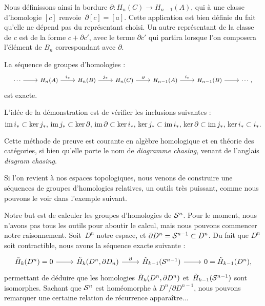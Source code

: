 Nous définissons ainsi la bordure $\partial:H_n(C)\to H_{n-1}(A)$, qui à une classe d'homologie $[c]$ renvoie~$\partial[c]=[a]$. Cette application est bien définie du fait qu'elle ne dépend pas du représentant choisi. Un autre représentant de la classe de $c$ est de la forme $c+\partial c'$, avec le terme $\partial c'$ qui partira lorsque l'on composera l'élément de $B_n$ correspondant avec $\partial$.

\begin{theorem}
La séquence de groupes d'homologies : \[\footnotesize\begin{tikzcd}
\cdots\arrow[r]&H_n(A)\arrow[r,"i_\ast"]&H_n(B)\arrow[r,"j_\ast"]&H_n(C)\arrow[r,"\partial"]&H_{n-1}(A)\arrow[r,"i_\ast"]&H_{n-1}(B)\arrow[r]&\cdots,
\end{tikzcd}\]est exacte.
\end{theorem}
L'idée de la démonstration est de vérifier les inclusions suivantes \cite{Hatcher} : \[\mathrm{im}\, i_\ast\subset \ker j_\ast,\,\mathrm{im}\, j_\ast\subset\ker\partial,\,\mathrm{im}\,\partial\subset\ker i_\ast,\,\ker j_\ast\subset\mathrm{im}\, i_\ast,\,\ker\partial\subset\mathrm{im}\, j_\ast,\,\ker i_\ast\subset i_\ast.\]
\begin{remark}
Cette méthode de preuve est courante en algèbre homologique et en théorie des catégories, si bien qu'elle porte le nom de \emph{diagramme chasing}, venant de l'anglais \emph{diagram chasing}.
\end{remark}

Si l'on revient à nos espaces topologiques, nous venons de construire une séquences de groupes d'homologies relatives, un outils très puissant, comme nous pouvons le voir dans l'exemple suivant.

\begin{exemple}
Notre but est de calculer les groupes d'homologies de $\mathcal{S}^{n}$. Pour le moment, nous n'avons pas tous les outils pour aboutir le calcul, mais nous pouvons commencer notre raisonnement. Soit~$D^n$ notre espace, et $\partial D^n=\mathcal{S}^{n-1}\subset D^n$. Du fait que $D^n$ soit contractible, nous avons la séquence exacte suivante :\[\begin{tikzcd}
\Tilde{H}_k(D^n)=0\arrow[r]&\Tilde{H}_k(D^n,\partial D_n)\arrow[r,"\partial"]&\Tilde{H}_{k-1}(\s{n-1})\arrow[r]&0=\Tilde{H}_{k-1}(D^n),
\end{tikzcd}\]permettant de déduire que les homologies $\Tilde{H}_k(D^n,\partial D^n)$ et~$\Tilde{H}_{k-1}(\mathcal{S}^{n-1})$ sont isomorphes. Sachant que $\mathcal{S}^{n}$ est homéomorphe à $D^n/\partial D^{n-1}$, nous pouvons remarquer une certaine relation de récurrence apparaître...
\end{exemple}

